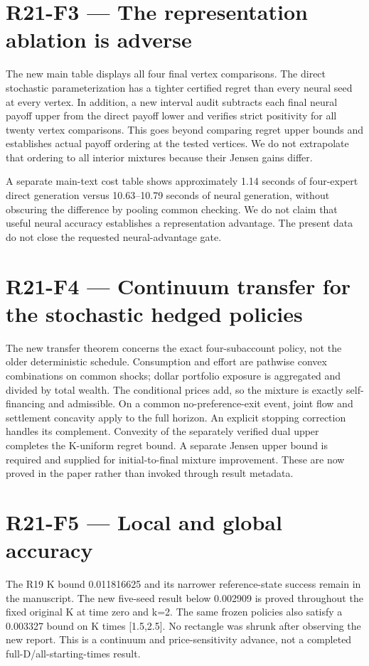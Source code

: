 \documentclass[ecta]{econsocart}
\theoremstyle{remark}
\begin{document}
\section{R21-F3 — The representation ablation is adverse}
The new main table displays all four final vertex comparisons. The direct stochastic parameterization has a tighter certified regret than every neural seed at every vertex. In addition, a new interval audit subtracts each final neural payoff upper from the direct payoff lower and verifies strict positivity for all twenty vertex comparisons. This goes beyond comparing regret upper bounds and establishes actual payoff ordering at the tested vertices. We do not extrapolate that ordering to all interior mixtures because their Jensen gains differ.

A separate main-text cost table shows approximately 1.14 seconds of four-expert direct generation versus 10.63–10.79 seconds of neural generation, without obscuring the difference by pooling common checking. We do not claim that useful neural accuracy establishes a representation advantage. The present data do not close the requested neural-advantage gate.

\section{R21-F4 — Continuum transfer for the stochastic hedged policies}
The new transfer theorem concerns the exact four-subaccount policy, not the older deterministic schedule. Consumption and effort are pathwise convex combinations on common shocks; dollar portfolio exposure is aggregated and divided by total wealth. The conditional prices add, so the mixture is exactly self-financing and admissible. On a common no-preference-exit event, joint flow and settlement concavity apply to the full horizon. An explicit stopping correction handles its complement. Convexity of the separately verified dual upper completes the K-uniform regret bound. A separate Jensen upper bound is required and supplied for initial-to-final mixture improvement. These are now proved in the paper rather than invoked through result metadata.

\section{R21-F5 — Local and global accuracy}
The R19 K bound 0.011816625 and its narrower reference-state success remain in the manuscript. The new five-seed result below 0.002909 is proved throughout the fixed original K at time zero and k=2. The same frozen policies also satisfy a 0.003327 bound on K times [1.5,2.5]. No rectangle was shrunk after observing the new report. This is a continuum and price-sensitivity advance, not a completed full-D/all-starting-times result.
\end{document}
